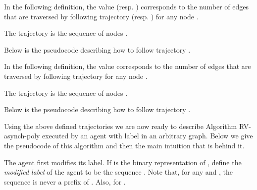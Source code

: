 \documentclass [11pt] {article}
\begin{document}
{In the following definition, the value  (resp. ) corresponds to the number of edges that are traversed by following trajectory  (resp. ) for any node .}

\begin{definition}
\label{def:K}
The trajectory  is the sequence of nodes . 
\end{definition}

{Below is the pseudocode describing how to follow trajectory .}

\begin{center}
\end{center} 

{In the following definition, the value  corresponds to the number of edges that are traversed by following trajectory  for any node .}

\begin{definition}
\label{def:ome}
The trajectory  is the sequence of nodes .
\end{definition}

{Below is the pseudocode describing how to follow trajectory .}

\begin{center}
\end{center} 


{Using the above defined trajectories we are now ready to describe Algorithm RV-asynch-poly executed by an agent with label  in an arbitrary graph. Below we give the pseudocode of this algorithm and then the main intuition that is behind it.}



The agent first modifies its label. If  is the binary representation of , define the {\em modified label} of the agent to be the sequence .  
Note that, for any  and , the sequence  is never a prefix of .
Also,  for . 
\end{document}
